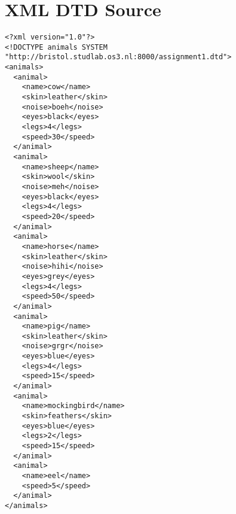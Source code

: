 \section{XML DTD Source}\label{appendice:xmldtdsrc}
\begin{verbatim}
<?xml version="1.0"?>
<!DOCTYPE animals SYSTEM "http://bristol.studlab.os3.nl:8000/assignment1.dtd">
<animals>
  <animal>
    <name>cow</name>
    <skin>leather</skin>
    <noise>boeh</noise>
    <eyes>black</eyes>
    <legs>4</legs>
    <speed>30</speed>
  </animal>
  <animal>
    <name>sheep</name>
    <skin>wool</skin>
    <noise>meh</noise>
    <eyes>black</eyes>
    <legs>4</legs>
    <speed>20</speed>
  </animal>
  <animal>
    <name>horse</name>
    <skin>leather</skin>
    <noise>hihi</noise>
    <eyes>grey</eyes>
    <legs>4</legs>
    <speed>50</speed>
  </animal> 
  <animal>
    <name>pig</name>
    <skin>leather</skin>
    <noise>grgr</noise>
    <eyes>blue</eyes>
    <legs>4</legs>
    <speed>15</speed>
  </animal> 
  <animal>
    <name>mockingbird</name>
    <skin>feathers</skin>
    <eyes>blue</eyes>
    <legs>2</legs>
    <speed>15</speed>
  </animal>
  <animal>
    <name>eel</name>
    <speed>5</speed>
  </animal> 
</animals>
\end{verbatim}
